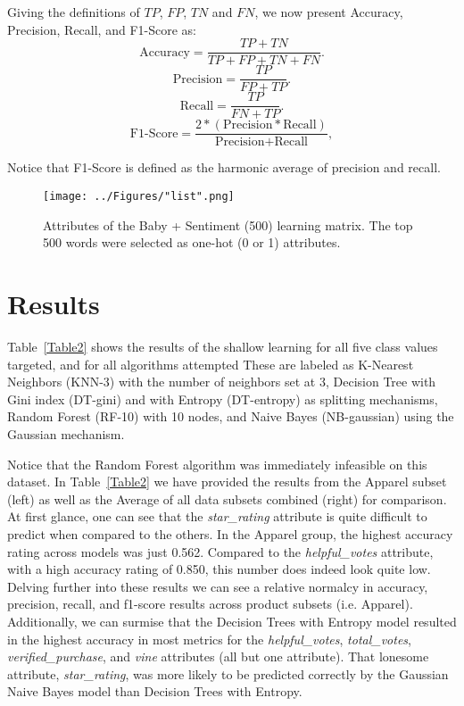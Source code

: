 \documentclass[10pt, conference, compsocconf]{IEEEtran}
\begin{document}
Giving the definitions of $TP$, $FP$, $TN$ and $FN$, we now present Accuracy, Precision, Recall, and F1-Score as:
\begin{equation}
	\text{Accuracy} = \frac{TP + TN}{TP + FP + TN + FN}.
\end{equation}
\begin{equation}
	\text{Precision} = \frac{TP}{FP + TP}.
\end{equation}
\begin{equation}
	\text{Recall} = \frac{TP}{FN + TP}.
\end{equation}
\begin{equation}
	\text{F1-Score}=\frac{2*(\text{Precision}* \text{Recall})}{\text{Precision}+\text{Recall}},
\end{equation}

\noindent Notice that F1-Score is defined as the harmonic average of precision and recall.

\begin{figure*}[htb]
	\centering
	\texttt{[image: ../Figures/"list".png]}\\
	\vspace{0.04cm}
	\caption{Attributes of the Baby + Sentiment (500) learning matrix. The top 500 words were selected as one-hot (0 or 1) attributes.}
	\vspace{0.01cm}
	\label{fig2}
\end{figure*}

\section{Results}

Table~\ref{Table2} shows the results of the shallow learning for all five class values targeted, and for all algorithms attempted These are labeled as K-Nearest Neighbors (KNN-3) with the number of neighbors set at 3, Decision Tree with Gini index (DT-gini) and with Entropy (DT-entropy) as splitting mechanisms, Random Forest (RF-10) with 10 nodes, and Naive Bayes (NB-gaussian) using the Gaussian mechanism. 

Notice that the Random Forest algorithm was immediately infeasible on this dataset. In Table~\ref{Table2} we have provided the results from the Apparel subset (left) as well as the Average of all data subsets combined (right) for comparison. At first glance, one can see that the \textit{star\_rating} attribute is quite difficult to predict when compared to the others. In the Apparel group, the highest accuracy rating across models was just 0.562. Compared to the \textit{helpful\_votes} attribute, with a high accuracy rating of 0.850, this number does indeed look quite low. Delving further into these results we can see a relative normalcy in accuracy, precision, recall, and f1-score results across product subsets (i.e. Apparel). Additionally, we can surmise that the Decision Trees with Entropy model resulted in the highest accuracy in most metrics for the \textit{helpful\_votes}, \textit{total\_votes}, \textit{verified\_purchase}, and \textit{vine} attributes (all but one attribute). That lonesome attribute, \textit{star\_rating}, was more likely to be predicted correctly by the Gaussian Naive Bayes model than Decision Trees with Entropy.
\end{document}
